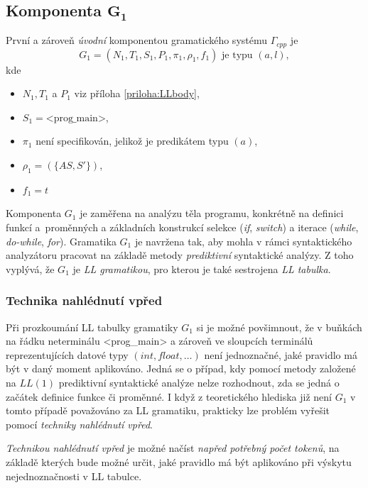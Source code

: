 \subsection*{Komponenta $\textbf{G}_\textbf{1}$}
První a zároveň \emph{úvodní} komponentou gramatického systému $\Gamma_{cpp}$ je
$$G_1 = (N_1, T_1, S_1, P_1, \pi_1, \rho_1, f_1)\text{ je typu } (a, l),$$ kde
\begin{itemize}
  \item $N_1, T_1$ a $P_1$ viz příloha \ref{priloha:LLbody},
  \item $S_1 = \text{<prog\_main>}$,
  \item $\pi_1$ není specifikován, jelikož je predikátem typu $(a)$,
  \item $\rho_1 = (\{AS, S'\})$,
  \item $f_1 = t$
\end{itemize}
Komponenta $G_1$ je zaměřena na analýzu těla programu, konkrétně na definici funkcí a~proměnných a základních konstrukcí selekce (\emph{if}, \emph{switch}) a
iterace (\emph{while}, \emph{do-while}, \emph{for}). Gramatika $G_1$ je navržena tak, aby mohla v rámci syntaktického analyzátoru pracovat na základě metody \emph{prediktivní}
syntaktické analýzy. Z toho vyplývá, že $G_1$ je \emph{LL gramatikou}, pro kterou je také sestrojena \emph{LL tabulka}.

\subsubsection{Technika nahlédnutí vpřed}
Při prozkoumání LL tabulky gramatiky $G_1$ si je možné povšimnout, že v buňkách na řádku neterminálu <prog\_main> a zároveň ve sloupcích terminálů
reprezentujících datové typy $(int, float, \dots)$ není jednoznačné, jaké pravidlo má být v daný moment aplikováno. Jedná se o případ, kdy pomocí metody založené na $LL(1)$
prediktivní syntaktické analýze nelze rozhodnout, zda se jedná o začátek definice funkce či proměnné. I když z teoretického hlediska již není $G_1$ v tomto případě považováno za
LL gramatiku, prakticky lze problém vyřešit pomocí \emph{techniky nahlédnutí vpřed}.
\begin{definice}
  \emph{Technikou nahlédnutí vpřed} je možné načíst \emph{napřed potřebný počet tokenů}, na základě kterých bude možné určit, jaké pravidlo má být aplikováno při výskytu nejednoznačnosti
  v LL tabulce.
\end{definice}

